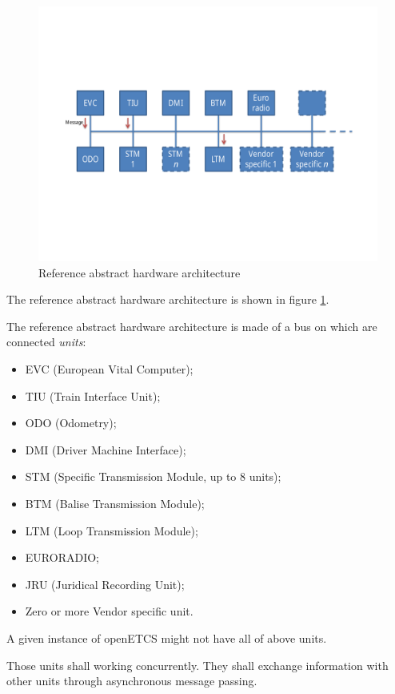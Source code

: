 \documentclass{template/openetcs_report}
\newcommand{\define}[1]{\index{#1}\emph{#1}}
\begin{document}
\begin{figure}
  \centering
  \includegraphics[width=\linewidth]{abstract-hardware-architecture.pdf}
  \caption{Reference abstract hardware architecture}
  \label{fig:hardware-arch}
\end{figure}

The reference abstract hardware architecture is shown in figure
\ref{fig:hardware-arch}.

The reference abstract hardware architecture is made of a bus on which
are connected \define{units}:
\begin{itemize}
\item EVC (European Vital Computer);
\item TIU (Train Interface Unit);
\item ODO (Odometry);
\item DMI (Driver Machine Interface);
\item STM (Specific Transmission Module, up to 8 units);
\item BTM (Balise Transmission Module);
\item LTM (Loop Transmission Module);
\item EURORADIO;
\item JRU (Juridical Recording Unit);
\item Zero or more Vendor specific unit.
\end{itemize}

A given instance of openETCS might not have all of above
units. 

Those units shall working concurrently. They shall exchange
information with other units through asynchronous message passing.
\end{document}
